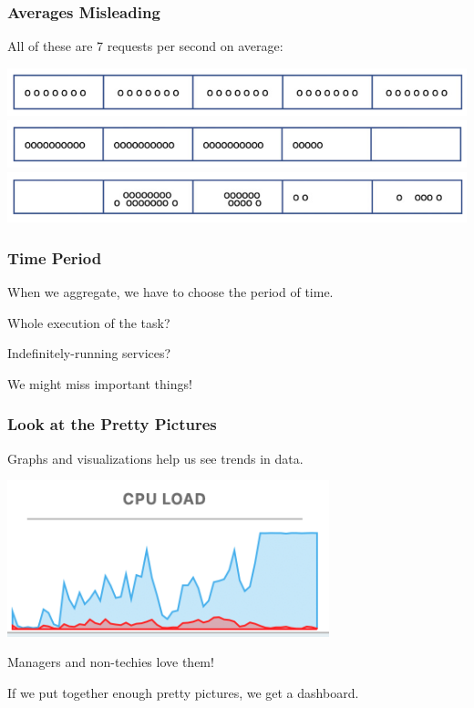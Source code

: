\begin{frame}
\frametitle{Averages Misleading}

All of these are 7 requests per second on average:

\begin{center}
	\includegraphics[width=\textwidth]{images/burst1}\\
	\includegraphics[width=\textwidth]{images/burst2}\\
	\includegraphics[width=\textwidth]{images/burst3}\\
\end{center}


\end{frame}

\begin{frame}
\frametitle{Time Period}

When we aggregate, we have to choose the period of time.

Whole execution of the task?

Indefinitely-running services?

We might miss important things!

\end{frame}


\begin{frame}
\frametitle{Look at the Pretty Pictures}

Graphs and visualizations help us see trends in data.

\begin{center}
	\includegraphics[width=0.7\textwidth]{images/cpu-load.png}
\end{center}

Managers and non-techies love them!

If we put together enough pretty pictures, we get a dashboard.

\end{frame}


